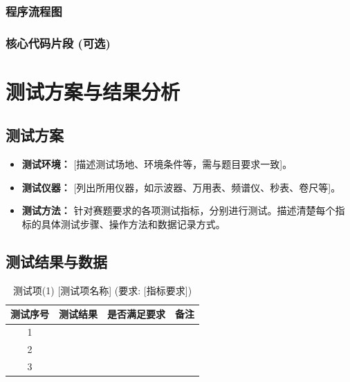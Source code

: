 \documentclass{ctexart}
\begin{document}
\subsubsection{程序流程图}
    
\subsubsection{核心代码片段 (可选)}

\section{测试方案与结果分析}
\subsection{测试方案}
    \begin{itemize}
        \item \textbf{测试环境：} [描述测试场地、环境条件等，需与题目要求一致]。
        \item \textbf{测试仪器：} [列出所用仪器，如示波器、万用表、频谱仪、秒表、卷尺等]。
        \item \textbf{测试方法：} 针对赛题要求的各项测试指标，分别进行测试。描述清楚每个指标的具体测试步骤、操作方法和数据记录方式。
    \end{itemize}

\subsection{测试结果与数据}
    \begin{table}[H]
        \centering
        \caption{测试项(1) [测试项名称] (要求: [指标要求])}
        \label{tab:task1}
        \begin{tabular}{cccc}
            \toprule
            测试序号 & 测试结果 & 是否满足要求 & 备注 \\
            \midrule
            1 & & & \\
            2 & & & \\
            3 & & & \\
            \bottomrule
        \end{tabular}
    \end{table}
\end{document}
